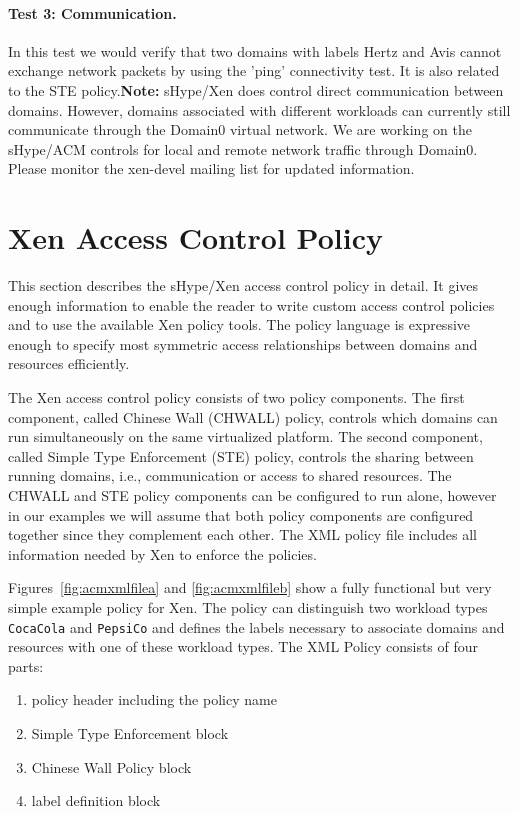\documentclass[11pt,twoside,final,openright]{report}
\begin{document}
\paragraph{Test 3: Communication.} In this test we would verify that
two domains with labels Hertz and Avis cannot exchange network packets
by using the 'ping' connectivity test. It is also related to the STE
policy.{\bf Note:} sHype/Xen does control direct communication between
domains. However, domains associated with different workloads can
currently still communicate through the Domain0 virtual network. We
are working on the sHype/ACM controls for local and remote network
traffic through Domain0.  Please monitor the xen-devel mailing list
for updated information.

\section{Xen Access Control Policy}
\label{section:acmpolicy}

This section describes the sHype/Xen access control policy in detail.
It gives enough information to enable the reader to write custom
access control policies and to use the available Xen policy tools. The
policy language is expressive enough to specify most symmetric access
relationships between domains and resources efficiently.

The Xen access control policy consists of two policy components. The
first component, called Chinese Wall (CHWALL) policy, controls which
domains can run simultaneously on the same virtualized platform. The
second component, called Simple Type Enforcement (STE) policy,
controls the sharing between running domains, i.e., communication or
access to shared resources. The CHWALL and STE policy components can
be configured to run alone, however in our examples we will assume
that both policy components are configured together since they
complement each other. The XML policy file includes all information
needed by Xen to enforce the policies.

Figures~\ref{fig:acmxmlfilea} and \ref{fig:acmxmlfileb} show a fully
functional but very simple example policy for Xen. The policy can
distinguish two workload types \verb|CocaCola| and \verb|PepsiCo| and
defines the labels necessary to associate domains and resources with
one of these workload types. The XML Policy consists of four parts:
\begin{enumerate}
\item policy header including the policy name
\item Simple Type Enforcement block
\item Chinese Wall Policy block
\item label definition block
\end{enumerate}
\end{document}
